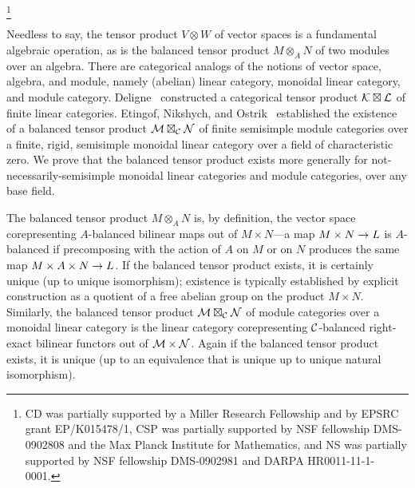 \documentclass{amsart}
\begin{document}
\thanks{CD was partially supported by a Miller Research Fellowship and by EPSRC grant EP/K015478/1, CSP was partially supported by NSF fellowship DMS-0902808 and the Max Planck Institute for Mathematics, and NS was partially supported by NSF fellowship DMS-0902981 and DARPA HR0011-11-1-0001.
}


\maketitle	

\tikzexternaldisable


Needless to say, the tensor product $V \otimes W$ of vector spaces is a fundamental algebraic operation, as is the balanced tensor product $M \otimes_A N$ of two modules over an algebra.  There are categorical analogs of the notions of vector space, algebra, and module, namely (abelian) linear category, monoidal linear category, and module category.  Deligne~\cite{MR1106898} constructed a categorical tensor product $\mathcal K \boxtimes \mathcal L$ of finite linear categories.  Etingof, Nikshych, and Ostrik~\cite{0909.3140} established the existence of a balanced tensor product $\mathcal M \boxtimes_{\mathcal C} \mathcal N$ of finite semisimple module categories over a finite, rigid, semisimple monoidal linear category over a field of characteristic zero.  We prove that the balanced tensor product exists more generally for not-necessarily-semisimple monoidal linear categories and module categories, over any base field.

The balanced tensor product $M \otimes_A N$ is, by definition, the vector space corepresenting $A$-balanced bilinear maps out of $M \times N$---a map $M \times N \rightarrow L$ is $A$-balanced if precomposing with the action of $A$ on $M$ or on $N$ produces the same map $M \times A \times N \rightarrow L$.  If the balanced tensor product exists, it is certainly unique (up to unique isomorphism); existence is typically established by explicit construction as a quotient of a free abelian group on the product $M \times N$.  Similarly, the balanced tensor product $\mathcal M \boxtimes_{\mathcal C} \mathcal N$ of module categories over a monoidal linear category is the linear category corepresenting $\mathcal C$-balanced right-exact bilinear functors out of $\mathcal M \times \mathcal N$.  Again if the balanced tensor product exists, it is unique (up to an equivalence that is unique up to unique natural isomorphism).  
\end{document}
